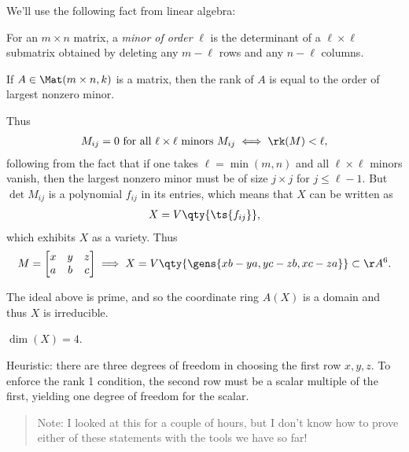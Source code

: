 \begin{solution}

We'll use the following fact from linear algebra:

\begin{definition}

For an \(m\times n\) matrix, a \emph{minor of order} \(\ell\) is the
determinant of a \(\ell\times \ell\) submatrix obtained by deleting any
\(m-\ell\) rows and any \(n-\ell\) columns.

\end{definition}

\begin{theorem}

If \(A\in \Mat(m \times n, k)\) is a matrix, then the rank of \(A\) is
equal to the order of largest nonzero minor.

\end{theorem}

Thus
\begin{align*}  
M_{ij} = 0 \text{ for all $\ell\times \ell$ minors } M_{ij} \iff \rk(M) < \ell
,\end{align*} following from the fact that if one takes
\(\ell = \min(m,n)\) and all \(\ell\times \ell\) minors vanish, then the
largest nonzero minor must be of size \(j\times j\) for
\(j\leq \ell -1\). But \(\det M_{ij}\) is a polynomial \(f_{ij}\) in its
entries, which means that \(X\) can be written as
\begin{align*}  
X = V\qty{\ts{f_{ij}}}
,\end{align*} which exhibits \(X\) as a variety. Thus
\begin{align*}  
M = 
\begin{bmatrix}
x & y & z \\
a & b & c
\end{bmatrix}
\implies
X = V\qty{\gens{xb-ya, yc-zb, xc-za}} \subset \AA^6 
.\end{align*}

\begin{claim}

The ideal above is prime, and so the coordinate ring \(A(X)\) is a
domain and thus \(X\) is irreducible.

\end{claim}

\begin{claim}

\(\dim (X) = 4\).

\end{claim}

Heuristic: there are three degrees of freedom in choosing the first row
\(x,y,z\). To enforce the rank 1 condition, the second row must be a
scalar multiple of the first, yielding one degree of freedom for the
scalar.

\begin{quote}
Note: I looked at this for a couple of hours, but I don't know how to
prove either of these statements with the tools we have so far!
\end{quote}

\end{solution}

